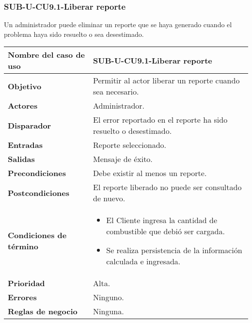 \subsubsection{SUB-U-CU9.1-Liberar reporte}\label{SUB-U-CU9.1}
Un administrador puede eliminar un reporte que se haya generado cuando el problema haya sido resuelto o sea desestimado.

\begin{longtable}{|J{5cm}|J{10.3cm}|}
	\hline
	\textbf{Nombre del caso de uso} &
		SUB-U-CU9.1-Liberar reporte \\ \hline
	\textbf{Objetivo} &
		Permitir al actor liberar un reporte cuando sea necesario. \\ \hline
	\textbf{Actores} &
		Administrador. \\ \hline 
	\textbf{Disparador} & 
		El error reportado en el reporte ha sido resuelto o desestimado. \\ \hline 
	\textbf{Entradas} & Reporte seleccionado.
		\\ \hline 
	\textbf{Salidas} & Mensaje de éxito.
		\\ \hline
	\textbf{Precondiciones} &
		Debe existir al menos un reporte.\\ \hline
	\textbf{Postcondiciones} & El reporte liberado no puede ser consultado de nuevo.
		\\ \hline
	\textbf{Condiciones de término} & 
		\begin{itemize}
			\item El Cliente ingresa la cantidad de combustible que debió ser cargada.
			\item Se realiza persistencia de la información calculada e ingresada.
		\end{itemize} \\ \hline 
	\textbf{Prioridad} & 
		Alta. \\ \hline
	\textbf{Errores} & Ninguno.
		\\ \hline
	\textbf{Reglas de negocio} & Ninguna.
		 \\ \hline
\end{longtable}

